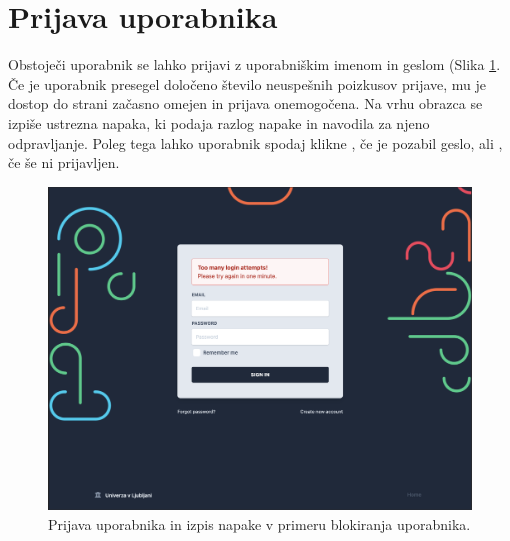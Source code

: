 \documentclass[a4paper, 12pt]{book}
\begin{document}
\newpage
\section{Prijava uporabnika }
\label{sign-in-page}
Obstoječi uporabnik se lahko prijavi z uporabniškim imenom in geslom (Slika \ref{login-form}. Če je uporabnik presegel določeno število neuspešnih poizkusov prijave, mu je dostop do strani začasno omejen in prijava onemogočena. Na vrhu obrazca se izpiše ustrezna napaka, ki podaja razlog napake in navodila za njeno odpravljanje. Poleg tega lahko uporabnik spodaj klikne , če je pozabil geslo, ali , če še ni prijavljen. 



\begin{figure}[h]
\begin{center}
\includegraphics[width=1\textwidth]{slike/signin-throttling.png}
\end{center}
\caption{ Prijava uporabnika in izpis napake v primeru blokiranja uporabnika. }
\label{login-form}
\end{figure}

\end{document}
